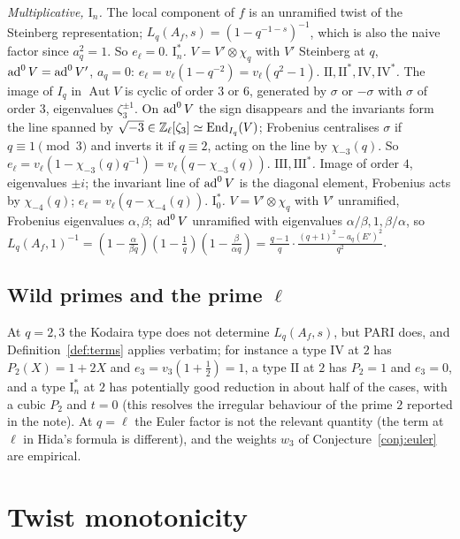 \documentclass[11pt]{amsart}
\theoremstyle{definition}
\begin{document}
\emph{Multiplicative, $\mathrm{I}_n$.} The local component of $f$ is an unramified twist of the Steinberg representation; $L_q(A_f,s)=(1-q^{-1-s})^{-1}$, which is also the naive factor since $a_q^2=1$. So $e_\ell=0$. \emph{$\mathrm{I}_n^*$.} $V=V'\otimes\chi_q$ with $V'$ Steinberg at $q$, $\operatorname{ad}^0 V=\operatorname{ad}^0 V'$, $a_q=0$: $e_\ell=v_\ell(1-q^{-2})=v_\ell(q^2-1)$. \emph{$\mathrm{II},\mathrm{II}^*,\mathrm{IV},\mathrm{IV}^*$.} The image of $I_q$ in $\operatorname{Aut}V$ is cyclic of order $3$ or $6$, generated by $\sigma$ or $-\sigma$ with $\sigma$ of order $3$, eigenvalues $\zeta_3^{\pm1}$. On $\operatorname{ad}^0 V$ the sign disappears and the invariants form the line spanned by $\sqrt{-3}\in\mathbb{Z}_\ell[\zeta_3]\simeq\operatorname{End}_{I_q}(V)$; Frobenius centralises $\sigma$ if $q\equiv1\pmod3$ and inverts it if $q\equiv2$, acting on the line by $\chi_{-3}(q)$. So $e_\ell=v_\ell(1-\chi_{-3}(q)q^{-1})=v_\ell(q-\chi_{-3}(q))$. \emph{$\mathrm{III},\mathrm{III}^*$.} Image of order $4$, eigenvalues $\pm i$; the invariant line of $\operatorname{ad}^0 V$ is the diagonal element, Frobenius acts by $\chi_{-4}(q)$; $e_\ell=v_\ell(q-\chi_{-4}(q))$. \emph{$\mathrm{I}_0^*$.} $V=V'\otimes\chi_q$ with $V'$ unramified, Frobenius eigenvalues $\alpha,\beta$; $\operatorname{ad}^0 V$ unramified with eigenvalues $\alpha/\beta,1,\beta/\alpha$, so $L_q(A_f,1)^{-1}=(1-\frac{\alpha}{\beta q})(1-\frac1q)(1-\frac{\beta}{\alpha q})=\frac{q-1}{q}\cdot\frac{(q+1)^2-a_q(E')^2}{q^2}$.

\subsection{Wild primes and the prime $\ell$}
At $q=2,3$ the Kodaira type does not determine $L_q(A_f,s)$, but PARI does, and Definition~\ref{def:terms} applies verbatim; for instance a type $\mathrm{IV}$ at $2$ has $P_2(X)=1+2X$ and $e_3=v_3(1+\tfrac12)=1$, a type $\mathrm{II}$ at $2$ has $P_2=1$ and $e_3=0$, and a type $\mathrm{I}_n^*$ at $2$ has potentially good reduction in about half of the cases, with a cubic $P_2$ and $t=0$ (this resolves the irregular behaviour of the prime $2$ reported in the note). At $q=\ell$ the Euler factor is not the relevant quantity (the term at $\ell$ in Hida's formula is different), and the weights $w_3$ of Conjecture~\ref{conj:euler} are empirical.

\section{Twist monotonicity}\label{sec:twist}
\end{document}
